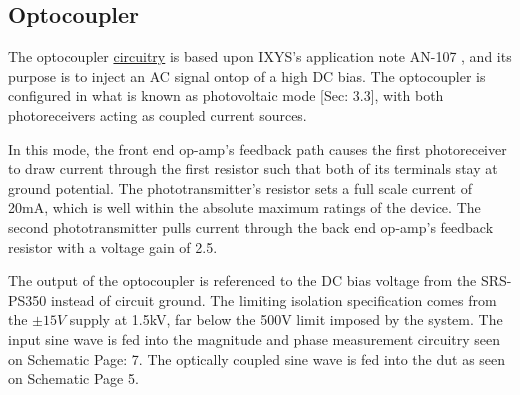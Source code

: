 \subsection{Optocoupler}
\label{sec:opto}

The optocoupler \hyperlink{sch:opto}{circuitry} is based upon IXYS's application note AN-107 \cite{locAppNote}, and its purpose is to inject an AC signal ontop of a high DC bias. The optocoupler is configured in what is known as photovoltaic mode \cite{locAppNote}[Sec: 3.3], with both photoreceivers acting as coupled current sources.

In this mode, the front end op-amp's feedback path causes the first photoreceiver to draw current through the first resistor such that both of its terminals stay at ground potential. The phototransmitter's resistor sets a full scale current of 20mA, which is well within the absolute maximum ratings of the device. The second phototransmitter pulls current through the back end op-amp's feedback resistor with a voltage gain of 2.5.

The output of the optocoupler is referenced to the DC bias voltage from the SRS-PS350 instead of circuit ground. The limiting isolation specification comes from the $\pm 15V$ supply at 1.5kV, far below the 500V limit imposed by the system. The input sine wave is fed into the magnitude and phase measurement circuitry seen on Schematic Page: 7. The optically coupled sine wave is fed into the \gls{dut} as seen on Schematic Page 5.


